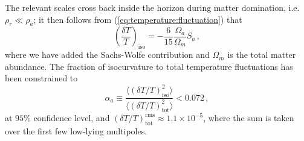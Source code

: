 \documentclass[preprint,nofootinbib]{revtex4}
\begin{document}
The relevant scales cross back inside the horizon during matter domination, i.e.\ $\rho_r \ll \rho_a$; it then follows from (\ref{eq:temperature:fluctuation}) that
\begin{equation}
 \left(\frac{\delta T}{T}\right)_\mathrm{iso} = -\frac{6}{15}\frac{\Omega_a}{\Omega_m} S_a\,,
\end{equation}
where we have added the Sachs-Wolfe contribution and $\Omega_m$ is the total matter abundance.
The fraction of isocurvature to total temperature fluctuations has been constrained to \cite{komatsu:wmap5:cosmological:interpretation}
\begin{equation}
 \alpha_a \equiv \frac{\langle(\delta T/T)^2_\mathrm{iso}\rangle}{\langle(\delta T/T)^2_\mathrm{tot}\rangle} < 0.072\,,
\end{equation}
at $95\%$ confidence level, and $(\delta T/T)^\mathrm{rms}_\mathrm{tot} \approx 1.1 \times 10^{-5}$, where the sum is taken over the first few low-lying multipoles.
\end{document}
